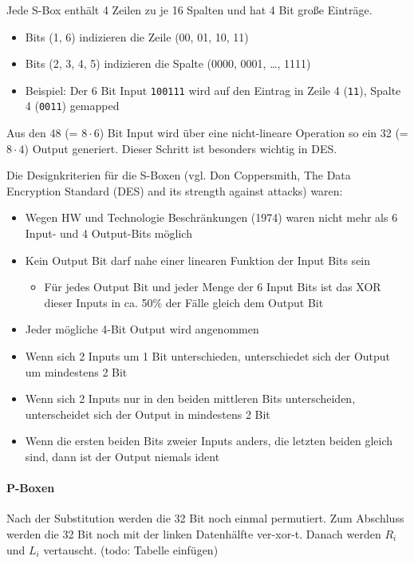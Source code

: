 Jede S-Box enthält 4 Zeilen zu je 16 Spalten und hat 4 Bit große Einträge.

\begin{itemize}
    \item Bits (1, 6) indizieren die Zeile (00, 01, 10, 11)
    \item Bits (2, 3, 4, 5) indizieren die Spalte (0000, 0001, \ldots, 1111)
    \item Beispiel: Der 6 Bit Input \verb|100111| wird auf den Eintrag in Zeile 4 (\verb|11|), Spalte 4 (\verb|0011|) gemapped
\end{itemize}

Aus den 48 (= $8 \cdot 6$) Bit Input wird über eine nicht-lineare Operation so ein 32 (= $8 \cdot 4$) Output generiert. Dieser Schritt ist besonders wichtig in DES.

Die Designkriterien für die S-Boxen (vgl. Don Coppersmith, The Data Encryption Standard (DES) and its strength against attacks) waren: 
\begin{itemize}
    \item Wegen HW und Technologie Beschränkungen (1974) waren nicht mehr als 6 Input- und 4 Output-Bits möglich 
    \item Kein Output Bit darf nahe einer linearen Funktion der Input Bits sein 
    \begin{itemize}
        \item Für jedes Output Bit und jeder Menge der 6 Input Bits ist das XOR dieser Inputs in ca. 50\% der Fälle gleich dem Output Bit
    \end{itemize}
    \item Jeder mögliche 4-Bit Output wird angenommen
    \item Wenn sich 2 Inputs um 1 Bit unterschieden, unterschiedet sich der Output um mindestens 2 Bit
    \item Wenn sich 2 Inputs nur in den beiden mittleren Bits unterscheiden, unterscheidet sich der Output in mindestens 2 Bit
    \item Wenn die ersten beiden Bits zweier Inputs anders, die letzten beiden gleich sind, dann ist der Output niemals ident
\end{itemize}

\paragraph{P-Boxen}

Nach der Substitution werden die 32 Bit noch einmal permutiert. Zum Abschluss werden die 32 Bit noch mit der linken Datenhälfte ver-xor-t. 
Danach werden $R_i$ und $L_i$ vertauscht. (todo: Tabelle einfügen)

